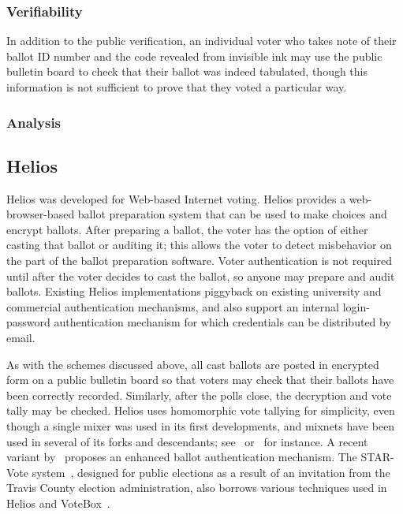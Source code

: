 \subsubsection{Verifiability}

In addition to the public verification, an individual voter who takes
note of their ballot ID number and the code revealed from invisible
ink may use the public bulletin board to check that their ballot was
indeed tabulated, though this information is not sufficient to prove
that they voted a particular way.

\subsubsection{Analysis}


\subsection{Helios~\cite{adida2008,adida2009}}

Helios was developed for Web-based Internet voting. Helios provides a
web-browser-based ballot preparation system that can be used to make
choices and encrypt ballots. After preparing a ballot, the voter has
the option of either casting that ballot or auditing it; this allows
the voter to detect misbehavior on the part of the ballot preparation
software. Voter authentication is not required until after the voter
decides to cast the ballot, so anyone may prepare and audit ballots.
Existing Helios implementations piggyback on existing university and
commercial authentication mechanisms, and also support an internal
login-password authentication mechanism for which credentials can be
distributed by email.

As with the schemes discussed above, all cast ballots are posted in
encrypted form on a public bulletin board so that voters may check
that their ballots have been correctly recorded. Similarly, after the
polls close, the decryption and vote tally may be checked. Helios uses
homomorphic vote tallying for simplicity, even though a single mixer
was used in its first developments, and mixnets have been used in
several of its forks and descendants; see~\cite{bulens2011}
or~\cite{tsoukalas2013} for instance. A recent variant
by~\cite{cortier2014} proposes an enhanced ballot authentication
mechanism. The STAR-Vote system~\cite{star-vote}, designed for public
elections as a result of an invitation from the Travis County election
administration, also borrows various techniques used in Helios and
VoteBox~\cite{sandler2008}.

